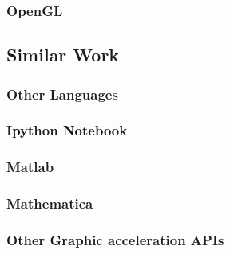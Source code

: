 \subsubsection{OpenGL}


\subsection{Similar Work}

\subsubsection{Other Languages}
\subsubsection{Ipython Notebook}
\subsubsection{Matlab}
\subsubsection{Mathematica}
\subsubsection{Other Graphic acceleration APIs}